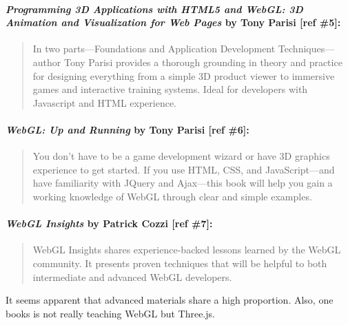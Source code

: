 \paragraph{\texorpdfstring{\emph{Programming 3D Applications with HTML5
and WebGL: 3D Animation and Visualization for Web Pages} by Tony Parisi
{[}ref
\#5{]}:}{Programming 3D Applications with HTML5 and WebGL: 3D Animation and Visualization for Web Pages by Tony Parisi {[}ref \#5{]}:}}\label{programming-3d-applications-with-html5-and-webgl-3d-animation-and-visualization-for-web-pages-by-tony-parisi-ref-5}

\begin{quote}
In two parts---Foundations and Application Development
Techniques---author Tony Parisi provides a thorough grounding in theory
and practice for designing everything from a simple 3D product viewer to
immersive games and interactive training systems. Ideal for developers
with Javascript and HTML experience.
\end{quote}

\paragraph{\texorpdfstring{\emph{WebGL: Up and Running} by Tony Parisi
{[}ref
\#6{]}:}{WebGL: Up and Running by Tony Parisi {[}ref \#6{]}:}}\label{webgl-up-and-running-by-tony-parisi-ref-6}

\begin{quote}
You don't have to be a game development wizard or have 3D graphics
experience to get started. If you use HTML, CSS, and JavaScript---and
have familiarity with JQuery and Ajax---this book will help you gain a
working knowledge of WebGL through clear and simple examples.
\end{quote}

\paragraph{\texorpdfstring{\emph{WebGL Insights} by Patrick Cozzi {[}ref
\#7{]}:}{WebGL Insights by Patrick Cozzi {[}ref \#7{]}:}}\label{webgl-insights-by-patrick-cozzi-ref-7}

\begin{quote}
WebGL Insights shares experience-backed lessons learned by the WebGL
community. It presents proven techniques that will be helpful to both
intermediate and advanced WebGL developers.
\end{quote}

It seems apparent that advanced materials share a high proportion. Also,
one books is not really teaching WebGL but Three.js.


